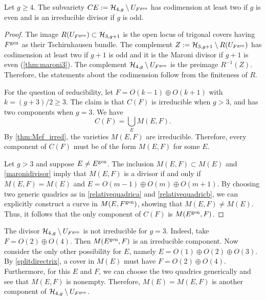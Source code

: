 \documentclass{article}
\renewcommand{\H}{\mathcal H}
\newcommand{\gen}{{\rm gen}}
\numberwithin{equation}{section}
\begin{document}
 \begin{proposition}\label{thm:4_compUf}
   Let $g \geq 4$. The subvariety $CE := \H_{4,g} \setminus
   U_{F^\gen}$ has codimension at least two if $g$ is even and is an
   irreducible divisor if $g$ is odd.
 \end{proposition}
\begin{proof}
  The image $R(U_{F^\gen}) \subset \H_{3,g+1}$ is the open locus of
  trigonal covers having $F^\gen$ as their Tschirnhausen bundle. The
  complement $Z := \H_{3,g+1} \setminus R(U_{F^\gen})$ has codimension
  at least two if $g+1$ is odd and it is the Maroni divisor if $g+1$
  is even (\autoref{thm:maroni3}). The complement $\H_{4,g} \setminus
  U_{F^\gen}$ is the preimage $R^{-1}(Z)$. Therefore, the statements
  about the codimension follow from the finiteness of $R$.

  For the question of reducibility, let $F = O(k-1) \oplus O(k+1)$
  with $k = (g+3)/2 \geq 3$. The claim is that $C(F)$ is irreducible
  when $g > 3$, and has two components when $g=3$. We have
  \[C(F) = \bigcup_{E} M(E,F).\]
  By \autoref{thm:Mef_irred}, the varieties $M(E,F)$ are
  irreducible. Therefore, every component of $C(F)$ must be of
  the form $M(E,F)$ for some $E$.

  Let $g > 3$ and suppose $E \neq E^\gen$. The inclusion $M(E, F)
  \subset M(E)$ and \autoref{maronidivisor} imply that $ M(E,
  F)$ is a divisor if and only if $M(E, F) =  M(E)$ and $E =
  O(m-1) \oplus O(m) \oplus O(m+1)$. By choosing two generic quadrics
  as in \eqref{relativequadrica} and \eqref{relativequadricb}, we can
  explicitly construct a curve in $ M(E, F^\gen)$, showing that
  $ M(E, F) \neq M(E)$. Thus, it follows that the only
  component of $C(F)$ is $M(E^\gen, F)$.
\end{proof}

\begin{example}
  The divisor $\H_{4,g} \setminus U_{F^\gen}$ is not irreducible
  for $g = 3$. Indeed, take $F = O(2) \oplus O(4)$. Then $M(E^\gen, F)$ is an irreducible component. Now consider the only
  other possibility for $E$, namely $E = O(1) \oplus O(2) \oplus
  O(3)$. By \eqref{splitdirectrix}, a cover in $M(E)$ must have
  $F = O(2) \oplus O(4)$. Furthermore, for this $E$ and $F$, we can
  choose the two quadrics generically and see that $M(E, F)$ is
  nonempty. Therefore, $M(E) = M(E, F)$ is another component
  of $\H_{4,g} \setminus U_{F^\gen}$.
\end{example}
\end{document}
